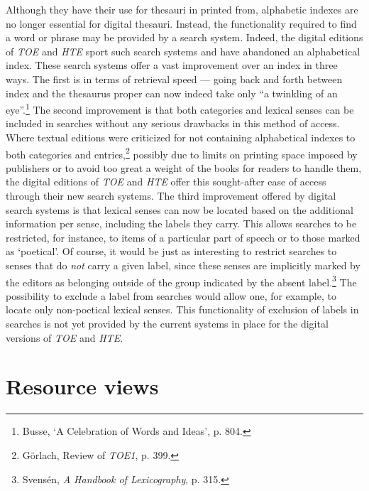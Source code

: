 Although they have their use for thesauri in printed from, alphabetic indexes are no longer essential for digital thesauri. Instead, the functionality required to find a word or phrase may be provided by a search system. Indeed, the digital editions of \textit{TOE} and \textit{HTE} sport such search systems and have abandoned an alphabetical index. These search systems offer a vast improvement over an index in three ways. The first is in terms of retrieval speed --- going back and forth between index and the thesaurus proper can now indeed take only ``a twinkling of an eye''.\footnote{Busse, `A Celebration of Words and Ideas', 
p. 804.} The second improvement is that both categories and lexical senses can be included in searches without any serious drawbacks in this method of access. Where textual editions were criticized for not containing alphabetical indexes to both categories and entries,\footnote{Görlach, Review of \textit{TOE1}, p. 399.} possibly due to limits on printing space imposed by publishers or to avoid too great a weight of the books for readers to handle them, the digital editions of \textit{TOE} and \textit{HTE} offer this sought-after ease of access through their new search systems. The third improvement offered by digital search systems is that lexical senses can now be located based on the additional information per sense, including the labels they carry. This allows searches to be restricted, for instance, to items of a particular part of speech or to those marked as `poetical'. Of course, it would be just as interesting to restrict searches to senses that do \textit{not} carry a given label, since these senses are implicitly marked by the editors as belonging outside of the group indicated by the absent label.\footnote{Svensén, \textit{A Handbook of Lexicography}, p. 315.} The possibility to exclude a label from searches would allow one, for example, to locate only non-poetical lexical senses. This functionality of exclusion of labels in searches is not yet provided by the current systems in place for the digital versions of \textit{TOE} and \textit{HTE}.%

\section{Resource views}
\label{sect:Stolk_thes-functionality:resource-views}

